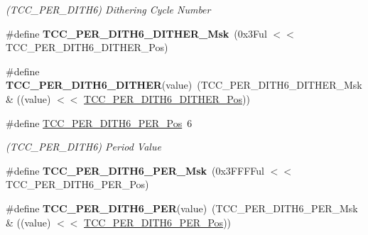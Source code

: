 \begin{DoxyCompactItemize}
\begin{DoxyCompactList}\small\item\em (T\+C\+C\+\_\+\+P\+E\+R\+\_\+\+D\+I\+T\+H6) Dithering Cycle Number \end{DoxyCompactList}\item 
\hypertarget{group___s_a_m_l21___t_c_c_ga7f07f859dcda36080f1d38c6a3ecc3e2}{}\#define {\bfseries T\+C\+C\+\_\+\+P\+E\+R\+\_\+\+D\+I\+T\+H6\+\_\+\+D\+I\+T\+H\+E\+R\+\_\+\+Msk}~(0x3\+Ful $<$$<$ T\+C\+C\+\_\+\+P\+E\+R\+\_\+\+D\+I\+T\+H6\+\_\+\+D\+I\+T\+H\+E\+R\+\_\+\+Pos)\label{group___s_a_m_l21___t_c_c_ga7f07f859dcda36080f1d38c6a3ecc3e2}

\item 
\hypertarget{group___s_a_m_l21___t_c_c_ga5ed02e894c76c94ccb86ce287e2208b6}{}\#define {\bfseries T\+C\+C\+\_\+\+P\+E\+R\+\_\+\+D\+I\+T\+H6\+\_\+\+D\+I\+T\+H\+E\+R}(value)~(T\+C\+C\+\_\+\+P\+E\+R\+\_\+\+D\+I\+T\+H6\+\_\+\+D\+I\+T\+H\+E\+R\+\_\+\+Msk \& ((value) $<$$<$ \hyperlink{group___s_a_m_l21___t_c_c_ga0aef363c030bf36a184597ebcd1e30df}{T\+C\+C\+\_\+\+P\+E\+R\+\_\+\+D\+I\+T\+H6\+\_\+\+D\+I\+T\+H\+E\+R\+\_\+\+Pos}))\label{group___s_a_m_l21___t_c_c_ga5ed02e894c76c94ccb86ce287e2208b6}

\item 
\hypertarget{group___s_a_m_l21___t_c_c_gad79c4214aa480e8332705a02aec33875}{}\#define \hyperlink{group___s_a_m_l21___t_c_c_gad79c4214aa480e8332705a02aec33875}{T\+C\+C\+\_\+\+P\+E\+R\+\_\+\+D\+I\+T\+H6\+\_\+\+P\+E\+R\+\_\+\+Pos}~6\label{group___s_a_m_l21___t_c_c_gad79c4214aa480e8332705a02aec33875}

\begin{DoxyCompactList}\small\item\em (T\+C\+C\+\_\+\+P\+E\+R\+\_\+\+D\+I\+T\+H6) Period Value \end{DoxyCompactList}\item 
\hypertarget{group___s_a_m_l21___t_c_c_ga3fdbab6ba8d28322b5b8fc631b840978}{}\#define {\bfseries T\+C\+C\+\_\+\+P\+E\+R\+\_\+\+D\+I\+T\+H6\+\_\+\+P\+E\+R\+\_\+\+Msk}~(0x3\+F\+F\+F\+Ful $<$$<$ T\+C\+C\+\_\+\+P\+E\+R\+\_\+\+D\+I\+T\+H6\+\_\+\+P\+E\+R\+\_\+\+Pos)\label{group___s_a_m_l21___t_c_c_ga3fdbab6ba8d28322b5b8fc631b840978}

\item 
\hypertarget{group___s_a_m_l21___t_c_c_gae1616e9b140afcb7370be347c103b412}{}\#define {\bfseries T\+C\+C\+\_\+\+P\+E\+R\+\_\+\+D\+I\+T\+H6\+\_\+\+P\+E\+R}(value)~(T\+C\+C\+\_\+\+P\+E\+R\+\_\+\+D\+I\+T\+H6\+\_\+\+P\+E\+R\+\_\+\+Msk \& ((value) $<$$<$ \hyperlink{group___s_a_m_l21___t_c_c_gad79c4214aa480e8332705a02aec33875}{T\+C\+C\+\_\+\+P\+E\+R\+\_\+\+D\+I\+T\+H6\+\_\+\+P\+E\+R\+\_\+\+Pos}))\label{group___s_a_m_l21___t_c_c_gae1616e9b140afcb7370be347c103b412}


\end{DoxyCompactItemize}
